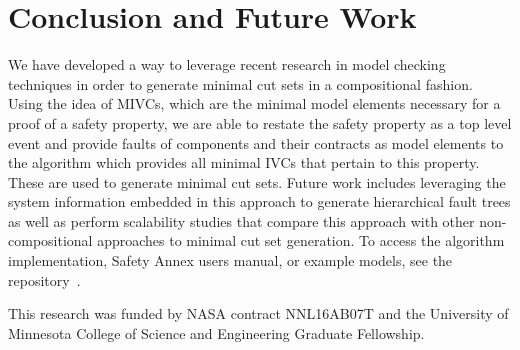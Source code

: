 \section{Conclusion and Future Work}
We have developed a way to leverage recent research in model checking techniques in order to generate minimal cut sets in a compositional fashion. Using the idea of MIVCs, which are the minimal model elements necessary for a proof of a safety property, we are able to restate the safety property as a top level event and provide faults of components and their contracts as model elements to the \aivcalg algorithm which provides all minimal IVCs that pertain to this property. These are used to generate minimal cut sets. Future work includes leveraging the system information embedded in this approach to generate hierarchical fault trees as well as perform scalability studies that compare this approach with other non-compositional approaches to minimal cut set generation.  %
To access the algorithm implementation, Safety Annex users manual, or example models, see the repository~\cite{SAGithub}. 

\vspace{2 mm}
 This research was funded by NASA contract NNL16AB07T and the University of Minnesota College of Science and Engineering Graduate Fellowship.


